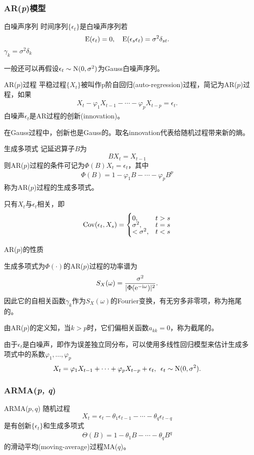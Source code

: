 \subsubsection{AR(\textit{p})模型}
\begin{definition}{白噪声序列}{}
	时间序列$\{\epsilon_t\}$是白噪声序列若
	\[
		\operatorname{E}(\epsilon_t)=0,\quad\operatorname{E}(\epsilon_s\epsilon_t)=\sigma^2\delta_{st}.
	\]
	$\gamma_k=\sigma^2\delta_k$
\end{definition}
一般还可以再假设$\epsilon_t\sim\operatorname{N}(0,\sigma^2)$为Gauss白噪声序列。
\begin{definition}{AR($p$)过程}{}
	平稳过程$\{X_t\}$被叫作p阶自回归(auto-regression)过程，简记为AR($p$)过程，如果
	\begin{align}
		X_t-\varphi_1X_{t-1}-\cdots-\varphi_pX_{t-p}=\epsilon_t.
	\end{align}
	白噪声$\epsilon_t$是AR过程的创新(innovation)。
\end{definition}
在Gauss过程中，创新也是Gauss的。取名innovation代表给随机过程带来新的熵。
\begin{definition}{生成多项式}{}
	记延迟算子$ B $为
	\[
		BX_t=X_{t-1}
	\]
	则AR($p$)过程的条件可记为$\Phi(B)X_t=\epsilon_t$，其中
	\begin{align}
		\Phi(B)=1-\varphi_1B-\cdots-\varphi_pB^p
	\end{align}
	称为AR($p$)过程的生成多项式。
\end{definition}
只有$X_t$与$\epsilon_t$相关，即
\begin{align*}
	\operatorname{Cov}(\epsilon_t,X_s)=\begin{cases}
		0,&t>s\\[-1ex]
		\sigma^2,&t=s\\[-1ex]
		<\sigma^2,&t<s
	\end{cases}
\end{align*}
\begin{theorem}{AR($p$)的性质}{}
	\begin{compactitem}
		\item 生成多项式为$\Phi(\cdot)$的AR($p$)过程的功率谱为
		\[
			S_X(\omega)=\frac{\sigma^2}{|\Phi(\mathop{}\!\mathrm{e}^{-\mathrm{i}\omega})|^2}.
		\]
		因此它的自相关函数$\gamma_k$作为$ S_X(\omega) $的Fourier变换，有无穷多非零项，称为拖尾的。
		\item 由AR($p$)的定义知，当$ k > p $时，它们偏相关函数$ a_{kk} = 0$，称为截尾的。
	\end{compactitem}
\end{theorem}
由于$\epsilon_t$是白噪声，即作为误差独立同分布，可以使用多线性回归模型来估计生成多项式中的系数$\varphi_1,\ldots,\varphi_p$
\[
	X_t=\varphi_1X_{t-1}+\cdots+\varphi_pX_{t-p}+\epsilon_t,\enspace\epsilon_t\sim\operatorname{N}(0,\sigma^2).
\]
\subsubsection{ARMA(\textit{p, q})}
\begin{definition}{ARMA($p,q$)}{}
	随机过程
	\[
		X_t=\epsilon_t-\theta_1\epsilon_{t-1}-\cdots-\theta_q\epsilon_{t-q}
	\]
	是有创新$\{\epsilon_t\}$和生成多项式
	\begin{align}
		\Theta(B)=1-\theta_1B-\cdots-\theta_qB^q
	\end{align}
	的滑动平均(moving-average)过程MA($q$)。
\end{definition}